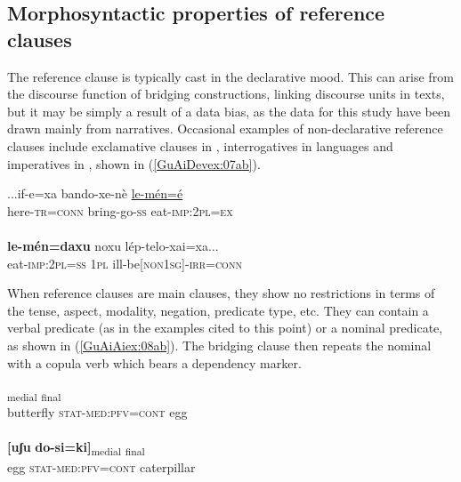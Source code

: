 \documentclass[output=paper]{LSP/langsci}
\begin{document}
\subsection{Morphosyntactic properties of reference clauses}
\label{GuAi2.2Morphosy.ref.cl}

The reference clause is typically cast in the declarative mood. This can arise from the discourse function of bridging constructions, linking discourse units in  texts, but it may be simply a result of a data bias, as the data for this study have been drawn mainly from narratives. Occasional examples of non-declarative reference clauses include exclamative clauses in  , interrogatives in  languages  and imperatives in , shown in (\ref{GuAiDevex:07ab}).

\begin{exe}
\ex \label{GuAiDevex:07ab}
\begin{xlist}
\ex \label{GuAiDevex:07a}						
\gll ...if-e=xa bando-xe-nè \underline{le-mén=é}\\
here-\textsc{tr=conn} bring-go-\textsc{ss} eat-\textsc{imp:2pl=ex}\\
\glt {}\\
\ex \label{GuAiDevex:07b}						
\gll \textbf{le-mén=daxu} noxu  lép-telo-xai=xa...\\
eat-\textsc{imp:2pl=ss} \textsc{1pl} ill-be\textsc{[non1sg]-irr=conn} \\
\glt {} 
\end{xlist}
\end{exe}


When reference clauses are main clauses, they show no restrictions in terms of the tense, aspect, modality, negation, predicate type, etc. They can contain a verbal predicate (as in the examples cited to this point) or a nominal predicate, as shown in (\ref{GuAiAiex:08ab}). The bridging clause then repeats the nominal with a copula verb which bears a dependency marker.

\noindent\parbox{\textwidth}{\begin{exe}
\ex \label{GuAiAiex:08ab}
\begin{xlist}
\ex \label{GuAiAiex:08a}
\gll [ɛjaːgɛ	do-si=ki]\textsubscript{medial} \underline{\smash{[uʃu]}}\textsubscript{final}\\
butterfly \textsc{stat}-\textsc{med}:\textsc{pfv}=\textsc{cont} egg\\
\glt {}\\
\ex \label{GuAiAiex:08b}
\gll \textbf{[uʃu}	\textbf{do-si=ki]}\textsubscript{medial}	\underline{\smash{[kɛkɛbɛaːnɛ]}}\textsubscript{final}\\
egg	\textsc{stat}-\textsc{med}:\textsc{pfv}=\textsc{cont} caterpillar\\
\glt {}
\end{xlist}
\end{exe}}
\end{document}
